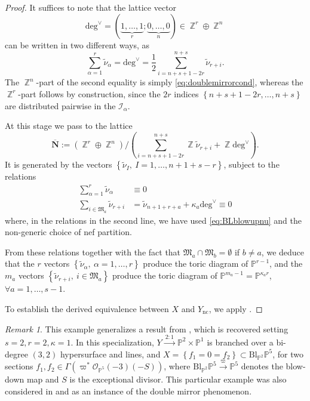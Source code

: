 \documentclass[12pt,a4paper,oneside]{amsart}
\numberwithin{equation}{section}
\theoremstyle{definition}
\theoremstyle{remark}
\newtheorem{rmk}[thm]{Remark}
\DeclareMathOperator{\Z}{\mathbb{Z}}
\newcommand{\cP}{\mathbb{P}}
\newcommand{\Ync}{Y_{\mathrm{nc}}}
\begin{document}
\begin{proof}
	It suffices to note that the lattice vector 
	\begin{equation*}
		\mathrm{deg}^{\vee} =  (\underbrace{1, \dots, 1}_{r}; \underbrace{0, \dots, 0}_{n}) \in \Z^r \oplus \Z^n
	\end{equation*}
	can be written in two different ways, as 
	\begin{equation*}
		\sum_{\alpha=1}^{r} \tilde{\nu}_{\alpha} = \mathrm{deg}^{\vee} = \frac{1}{2}\sum_{i=n+s+1-2r}^{n+s} \tilde{\nu}_{r+i} .
	\end{equation*}
	The $\Z^n$-part of the second equality is simply \eqref{eq:doublemirrorcond}, whereas the $\Z^r$-part follows by construction, since the $2r$ indices $\left\{ n+s+1-2r, \dots, n+s \right\}$ are distributed pairwise in the $\mathcal{I}_{\alpha}$.\par
	At this stage we pass to the lattice 
	\begin{equation*}
		\overline{\mathbf{N}} := (\Z^r \oplus \Z^n )/ \left(  \sum_{i=n+s+1-2r}^{n+s} \Z \tilde{\nu}_{r+i} + \Z \mathrm{deg}^{\vee} \right) .
	\end{equation*}
	It is generated by the vectors $\left\{\tilde{\nu}_{I}, \ I=1, \dots, n+1+s-r \right\}$, subject to the relations 
	\begin{align*}
		\sum_{\alpha=1}^{r}\tilde{\nu}_{\alpha} & \equiv 0  \\
		\sum_{i \in \mathfrak{M}_a} \tilde{\nu}_{r+i} & =  \tilde{\nu}_{n+1+r+a} + \kappa_a \mathrm{deg}^{\vee} \equiv 0 
	\end{align*}
	where, in the relations in the second line, we have used \eqref{eq:BLblowupnu} and the non-generic choice of nef partition.\par
	From these relations together with the fact that $\mathfrak{M}_a \cap \mathfrak{M}_b = \emptyset$ if $b \ne a$, we deduce that the $r$ vectors $\left\{ \tilde{\nu}_{\alpha}, \ \alpha=1, \dots, r \right\}$ produce the toric diagram of $\cP^{r-1}$, and the $m_a$ vectors $\left\{\tilde{\nu}_{r+i} , \ i \in \mathfrak{M}_a \right\}$ produce the toric diagram of $\cP^{m_a-1} = \cP^{\kappa_a r}$, $\forall a=1, \dots, s-1$.\par
	To establish the derived equivalence between $X$ and $\Ync$, we apply \cite{BorisovLi}.
\end{proof}
\begin{rmk}This example generalizes a result from \cite{Calabrese:2014}, which is recovered setting $s=2,r=2,\kappa=1$. In this specialization, $Y \xrightarrow{ \ 2:1 \ }\cP^2 \times \cP^1$ is branched over a bi-degree $(3,2)$ hypersurface and lines, and $X = \left\{ f_1 =0=f_2 \right\} \subset \mathrm{Bl}_{\cP^2} \cP^5$, for two sections $f_1,f_2 \in \Gamma \left( \varpi^{\ast} \mathcal{O}_{\cP^5} (-3) (-S) \right)$, where $\mathrm{Bl}_{\cP^2} \cP^5 \xrightarrow{ \ \varpi \ } \cP^5$ denotes the blow-down map and $S$ is the exceptional divisor. This particular example was also considered in \cite[\S9.3]{BorisovLi} and \cite[\S6.2]{Katz:2022lyl} as an instance of the double mirror phenomenon.
\end{rmk}
\end{document}
